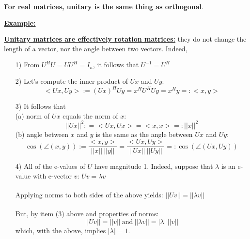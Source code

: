 \documentclass[letterpaper]{article}
\begin{document}
\vspace*{1cm}

\textbf{For real matrices, unitary is the same thing as orthogonal}.

\noindent \textbf{\underline{Example:}}


\newpage

\noindent \textbf{\underline{Unitary matrices are effectively rotation matrices:}} they do not change the length of a vector, nor the angle between two vectors. Indeed,
\vspace*{-.2in}
\begin{enumerate}
\setlength{\itemsep}{1cm}
\item[1)] From $U^H U = U U^H=I_n$, it follows that $U^{-1} =U^H$
\item[2)]  Let's compute the inner product of $U x$ and $U y$:
    $$ <U x,U y>:=(U x)^H U y = x^H U^H U y = x^H y = :<x,y>$$
\item[3)] It follows that \\
    (a) norm of $U x$ equals the norm of $x$:
       $$||U x||^2: = <U x,U x>=<x,x>=:||x||^2$$
    (b) angle between $x$ and $y$ is the same as the angle between $U x$ and $U y$:
    $$\cos(\angle(x,y)):=\frac{<x,y>}{||x||~ ||y||}=\frac{<U x,U y>}{||U x||~ ||U y||} =: \cos(\angle(U x,U y))$$
\item[4)] All of the e-values of $U$ have magnitude 1. Indeed, suppose that $\lambda$ is an e-value with e-vector $v$: $Uv=\lambda v$ \\
    \\
Applying norms to both sides of the above yields: $||Uv||=||\lambda v||$ \\
\\
But, by item (3) above and properties of norms:
$$ ||Uv||=||v||~\text{and}~ ||\lambda v||=|\lambda|~||v||$$
which, with the above, implies $|\lambda|=1$.
\end{enumerate}
\end{document}
